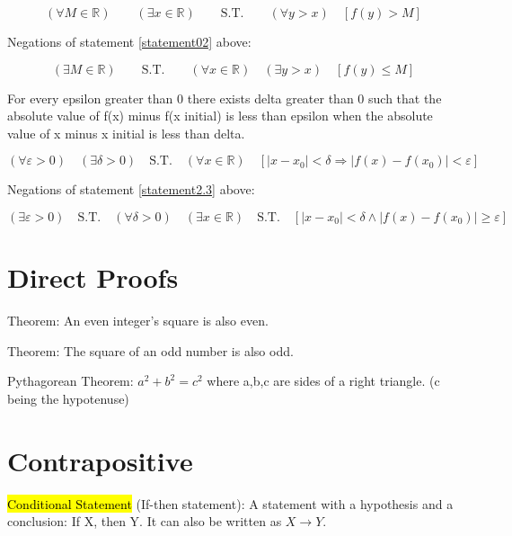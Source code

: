 \begin{equation}
  (\forall M \in \mathbb{R})\qquad (\exists x \in \mathbb{R})\qquad \text{S.T.}\qquad (\forall y > x)\quad [f(y) > M]  
  \label{statement02}
\end{equation}

Negations of statement \ref{statement02} above:

\begin{equation*}
  (\exists M \in \mathbb{R})\qquad \text{S.T.}\qquad (\forall x \in \mathbb{R})\quad (\exists y > x)\quad [f(y) \leq M]
\end{equation*}

For every epsilon greater than 0 there exists delta greater than 0 such that the absolute value of f(x) minus f(x initial) is less than epsilon when the absolute value of x minus x initial is less than delta.

\begin{equation}
  (\forall \varepsilon > 0)\quad (\exists \delta > 0)\quad \text{S.T.} \quad (\forall x \in \mathbb{R})\quad [|x-x_{0}| < \delta \Longrightarrow |f(x)-f(x_{0})| < \varepsilon]
  \label{statement2.3}
\end{equation}

Negations of statement \ref{statement2.3} above:

\begin{equation*}
  (\exists \varepsilon > 0)\quad \text{S.T.}\quad (\forall \delta >0)\quad (\exists x \in \mathbb{R})\quad \text{S.T.}\quad [|x-x_{0}| < \delta \wedge |f(x)-f(x_{0})| \geq \varepsilon]
\end{equation*}

\section{Direct Proofs}

Theorem: An even integer's square is also even.

Theorem: The square of an odd number is also odd.

Pythagorean Theorem: $a^{2}+b^{2}=c^{2}$ where a,b,c are sides of a right triangle. (c being the hypotenuse)

\section{Contrapositive}

\hl{Conditional Statement} (If-then statement): A statement with a hypothesis and a conclusion: If X, then Y. It can also be written as $X \rightarrow Y$.

